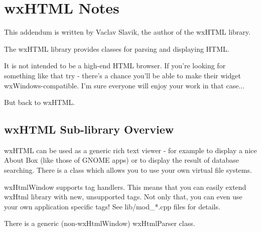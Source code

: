 \chapter{wxHTML Notes}\label{wxHTML}
%
%
\setfooter{\thepage}{}{}{}{}{\thepage}%

This addendum is written by Vaclav Slavik, the author of the wxHTML library.

The wxHTML library provides classes for parsing and displaying HTML.

It is not intended to be a high-end HTML browser. If you're looking for
something like that try  - there's a 
chance you'll be able to make their widget wxWindows-compatible. I'm sure
everyone will enjoy your work in that case...

But back to wxHTML. 

\section{wxHTML Sub-library Overview}\label{wxhtmloverview}

wxHTML can be used as a generic rich text viewer - for example to display 
a nice About Box (like those of GNOME apps) or to display the result of
database searching. There is a  
class which allows you to use your own virtual file systems.

wxHtmlWindow supports tag handlers. This means that you can easily
extend wxHtml library with new, unsupported tags. Not only that,
you can even use your own application specific tags!
See lib/mod\_*.cpp files for details.

There is a generic (non-wxHtmlWindow) wxHtmlParser class.

 






